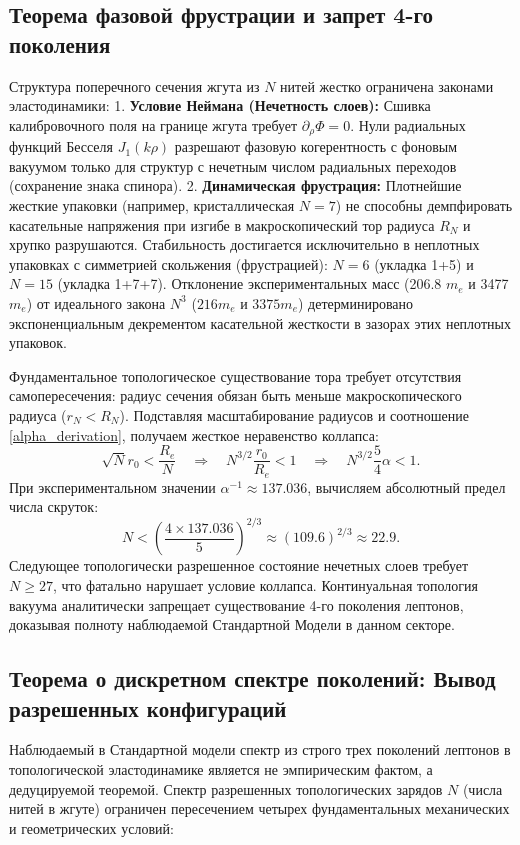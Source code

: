 \documentclass[11pt,a4paper]{article}
\begin{document}
	\subsection{Теорема фазовой фрустрации и запрет 4-го поколения}
	Структура поперечного сечения жгута из $N$ нитей жестко ограничена законами эластодинамики:
	1. \textbf{Условие Неймана (Нечетность слоев):} Сшивка калибровочного поля на границе жгута требует $\partial_\rho \Phi = 0$. Нули радиальных функций Бесселя $J_1(k\rho)$ разрешают фазовую когерентность с фоновым вакуумом только для структур с нечетным числом радиальных переходов (сохранение знака спинора).
	2. \textbf{Динамическая фрустрация:} Плотнейшие жесткие упаковки (например, кристаллическая $N=7$) не способны демпфировать касательные напряжения при изгибе в макроскопический тор радиуса $R_N$ и хрупко разрушаются. Стабильность достигается исключительно в неплотных упаковках с симметрией скольжения (фрустрацией): $N=6$ (укладка 1+5) и $N=15$ (укладка 1+7+7).
	Отклонение экспериментальных масс (206.8 $m_e$ и 3477 $m_e$) от идеального закона $N^3$ ($216 m_e$ и $3375 m_e$) детерминировано экспоненциальным декрементом касательной жесткости в зазорах этих неплотных упаковок.
	
	Фундаментальное топологическое существование тора требует отсутствия самопересечения: радиус сечения обязан быть меньше макроскопического радиуса ($r_N < R_N$). Подставляя масштабирование радиусов и соотношение \eqref{alpha_derivation}, получаем жесткое неравенство коллапса:
	\begin{equation}
		\sqrt{N} r_0 < \frac{R_e}{N} \quad \Longrightarrow \quad N^{3/2} \frac{r_0}{R_e} < 1 \quad \Longrightarrow \quad N^{3/2} \frac{5}{4}\alpha < 1.
	\end{equation}
	При экспериментальном значении $\alpha^{-1} \approx 137.036$, вычисляем абсолютный предел числа скруток:
	\begin{equation}
		N < \left( \frac{4 \times 137.036}{5} \right)^{2/3} \approx (109.6)^{2/3} \approx 22.9.
	\end{equation}
	Следующее топологически разрешенное состояние нечетных слоев требует $N \ge 27$, что фатально нарушает условие коллапса. Континуальная топология вакуума аналитически запрещает существование 4-го поколения лептонов, доказывая полноту наблюдаемой Стандартной Модели в данном секторе.
	
	\subsection{Теорема о дискретном спектре поколений: Вывод разрешенных конфигураций}
	Наблюдаемый в Стандартной модели спектр из строго трех поколений лептонов в топологической эластодинамике является не эмпирическим фактом, а дедуцируемой теоремой. Спектр разрешенных топологических зарядов $N$ (числа нитей в жгуте) ограничен пересечением четырех фундаментальных механических и геометрических условий:
	
\end{document}
